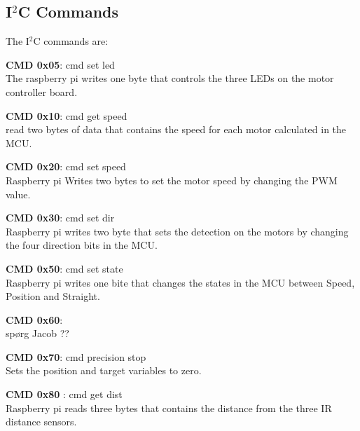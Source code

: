 \subsection{I$^2$C Commands}
The I$^2$C commands are:

\begin{itemize}
	\begin{item}
		\textbf{ CMD 0x05}: cmd set led\\ The raspberry pi writes one byte that controls the three LEDs on the motor controller board.
	\end{item}

	\begin{item}
		\textbf{ CMD 0x10}: cmd get speed\\ read two bytes of data that contains the speed for each motor calculated in the MCU.
	\end{item}
	
	\begin{item}
		\textbf{ CMD 0x20}: cmd set speed \\ Raspberry pi Writes two bytes to set the motor speed by changing the PWM value.
	\end{item}	
	
	\begin{item}
		\textbf{ CMD 0x30}: cmd set dir\\ Raspberry pi writes two byte that sets the detection on the motors by changing the four direction bits in the MCU.
	\end{item}

	\begin{item}
		\textbf{CMD 0x50}: cmd set state\\ Raspberry pi writes one bite that changes the states in the MCU between Speed, Position and Straight. 
	\end{item}
	
	\begin{item}
		\textbf{ CMD 0x60}: \\ spørg Jacob ??
	\end{item}
	
	\begin{item}
		\textbf{CMD 0x70}:  cmd precision stop\\ Sets the position and target variables to zero.
	\end{item}

	\begin{item}
		\textbf{CMD 0x80 }: cmd get dist\\ Raspberry pi reads three bytes that contains the distance from the three IR distance sensors.
	\end{item}
	

\end{itemize}
